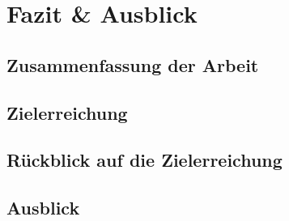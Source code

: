 \section{Fazit \& Ausblick}

\subsection{Zusammenfassung der Arbeit}
\subsection{Zielerreichung}
\subsection{Rückblick auf die Zielerreichung}
\subsection{Ausblick}

\label{seitenreinschrifft}
